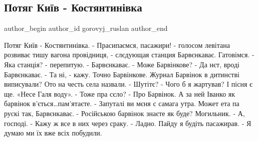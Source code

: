  
 
 
 
 
 
\subsection{Потяг Київ - Костянтинівка}
\label{sec:02_10_2021.fb.gorovyj_ruslan.1.poezd_kiev_konstantinovka_barvinok}
 
\ifcmt
 author_begin
   author_id gorovyj_ruslan
 author_end
\fi

\obeycr
Потяг Київ - Костянтинівка.
- Прасипаємся, пасажири! - голосом  левітана розвиває тишу вагона провідниця, - слєдующая станция Барвєнкаває. Гатовімся.
- Яка станція? - перепитую.
- Барвєнкаває.
- Може Барвінкове?
- Да нєт, вроді Барвєнкаває.
- Та ні, - кажу. Точно Барвінкове. Журнал Барвінок в дитинстві виписували? Ото на честь села назвали.
- Шутітє?
- Чого б я жартував? І пісня є ще. «Несе Галя воду».
- Тоже пра сєло?
- Про Барвінок. А за ней Іванко як барвінок в’ється…пам’ятаєте.
- Запуталі ви мєня с самага утра. Может ета па рускі так, Барвєнкаває.
- Російською барвінок знаєте як буде? Могильник.
- А, господі.
- Кажу ж все в них через сраку.
- Ладно. Пайду я будіть пасажирав.
- Я думаю ми їх вже всіх побудили.
\restorecr

